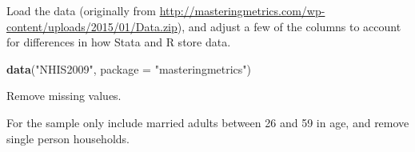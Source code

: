 \documentclass[]{book}
\newenvironment{Shaded}{\begin{snugshade}}{\end{snugshade}}
\newcommand{\KeywordTok}[1]{\textcolor[rgb]{0.13,0.29,0.53}{\textbf{#1}}}
\newcommand{\DataTypeTok}[1]{\textcolor[rgb]{0.13,0.29,0.53}{#1}}
\newcommand{\DecValTok}[1]{\textcolor[rgb]{0.00,0.00,0.81}{#1}}
\newcommand{\StringTok}[1]{\textcolor[rgb]{0.31,0.60,0.02}{#1}}
\newcommand{\OtherTok}[1]{\textcolor[rgb]{0.56,0.35,0.01}{#1}}
\newcommand{\OperatorTok}[1]{\textcolor[rgb]{0.81,0.36,0.00}{\textbf{#1}}}
\newcommand{\NormalTok}[1]{#1}
\theoremstyle{definition}
\theoremstyle{definition}
\theoremstyle{definition}
\theoremstyle{remark}
\begin{document}
Load the data (originally from
\url{http://masteringmetrics.com/wp-content/uploads/2015/01/Data.zip}),
and adjust a few of the columns to account for differences in how Stata
and R store data.

\begin{Shaded}
\begin{Highlighting}[]
\KeywordTok{data}\NormalTok{(}\StringTok{"NHIS2009"}\NormalTok{, }\DataTypeTok{package =} \StringTok{"masteringmetrics"}\NormalTok{)}
\end{Highlighting}
\end{Shaded}

Remove missing values.

\begin{Shaded}
\end{Shaded}

For the sample only include married adults between 26 and 59 in age, and
remove single person households.

\begin{Shaded}
\end{Shaded}
\end{document}

